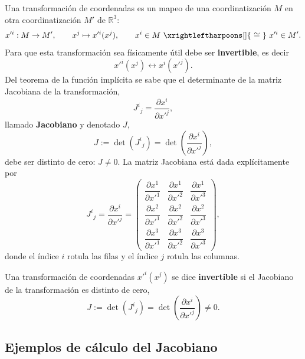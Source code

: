 Una transformación de coordenadas es un mapeo de una coordinatización $M$ en otra coordinatización $M'$ de $\mathbb{R}^3$:
\begin{equation}
x'^i : M\to M', \qquad x^j\mapsto x'^i(x^j), \qquad x^i\in M \ \xrightleftharpoons[]{\ \cong\ }\ x'^i\in M'.
\end{equation}
Para que esta transformación sea físicamente útil debe ser \textbf{invertible}, es decir
\begin{equation}
x'^i(x^j) \longleftrightarrow x^i(x'^j).
\end{equation}
Del teorema de la función implícita se sabe que el determinante de la matriz Jacobiana de la transformación,
\begin{equation}
J^i{}_j = \frac{\partial x^i}{\partial x'^j},
\end{equation}
llamado \textbf{Jacobiano} y denotado $J$,
\begin{equation}
J := \det\!\left(J^i{}_j\right) = \det\!\left(\frac{\partial x^i}{\partial x'^j}\right),
\end{equation}
debe ser distinto de cero: $J\neq 0$. La matriz Jacobiana está dada explícitamente por
\begin{equation}
J^i{}_j = \frac{\partial x^i}{\partial x'^j} =
\begin{pmatrix}
\dfrac{\partial x^1}{\partial x'^1} & \dfrac{\partial x^1}{\partial x'^2} & \dfrac{\partial x^1}{\partial x'^3} \\[8pt]
\dfrac{\partial x^2}{\partial x'^1} & \dfrac{\partial x^2}{\partial x'^2} & \dfrac{\partial x^2}{\partial x'^3} \\[8pt]
\dfrac{\partial x^3}{\partial x'^1} & \dfrac{\partial x^3}{\partial x'^2} & \dfrac{\partial x^3}{\partial x'^3}
\end{pmatrix},
\end{equation}
donde el índice $i$ rotula las filas y el índice $j$ rotula las columnas.

\begin{definicion}
Una transformación de coordenadas $x'^i(x^j)$ se dice \textbf{invertible} si el Jacobiano de la transformación es distinto de cero,
\begin{equation}
J := \det\!\left(J^i{}_j\right) = \det\!\left(\frac{\partial x^i}{\partial x'^j}\right) \neq 0 .
\end{equation}
\end{definicion}

\subsection{Ejemplos de cálculo del Jacobiano}

